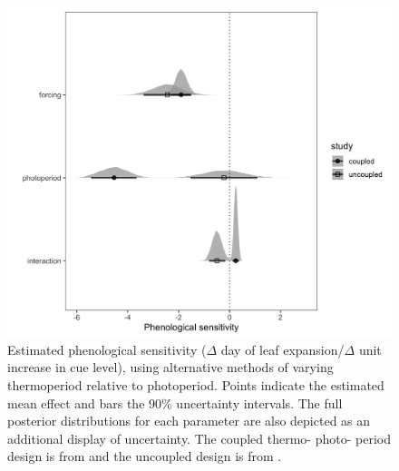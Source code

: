\documentclass[11pt]{article}
\begin{document}
\begin{figure}[h!]
    \centering
 \includegraphics[width=.8\textwidth]{..//Plots/periodicity_figures/modelcomps_winter.jpeg}
    \caption{Estimated phenological sensitivity ($\Delta$ day of leaf expansion/$\Delta$ unit increase in cue level), using alternative methods of varying thermoperiod relative to photoperiod. Points indicate the estimated mean effect and bars the 90\% uncertainty intervals. The full posterior distributions for each parameter are also depicted as an additional display of uncertainty. The coupled thermo- photo- period design is from \citet{Flynn2018} and the uncoupled design is from \cite{Buonaiuto:2021ug}.}
    \label{fig:compy}
\end{figure}
\end{document}
